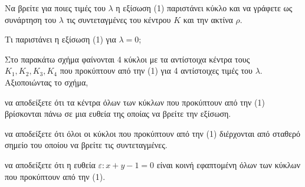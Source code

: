 \begin{alist}
    \item Να βρείτε για ποιες τιμές του $\lambda$ η εξίσωση (1) παριστάνει κύκλο και να γράφετε ως συνάρτηση του $\lambda$ τις συντεταγμένες του κέντρου $K$ και την ακτίνα $\rho$. 
    \item Τι παριστάνει η εξίσωση (1) για $\lambda=0$; 
    \item Στο παρακάτω σχήμα φαίνονται 4 κύκλοι με τα αντίστοιχα κέντρα τους $K_1, K_2, K_3, K_4$ που προκύπτουν από την (1) για 4 αντίστοιχες τιμές του $\lambda$. Αξιοποιώντας το σχήμα,
    \begin{rlist}
        \item να αποδείξετε ότι τα κέντρα όλων των κύκλων που προκύπτουν από την (1) βρίσκονται πάνω σε μια ευθεία της οποίας να βρείτε την εξίσωση. 
        \item να αποδείξετε ότι όλοι οι κύκλοι που προκύπτουν από την (1) διέρχονται από σταθερό σημείο του οποίου να βρείτε τις συντεταγμένες. 
        \item να αποδείξετε ότι η ευθεία $\varepsilon: x+y-1=0$ είναι κοινή εφαπτομένη όλων των κύκλων που προκύπτουν από την (1). 
    \end{rlist}
\end{alist}